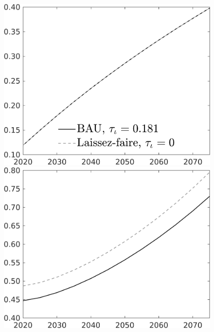 \documentclass[12pt]{article}
\begin{document}
\begin{figure}[h!!]
\begin{minipage}[]{0.32\textwidth}
	\end{minipage}	
	\begin{minipage}[]{0.32\textwidth}
		\includegraphics[width=1\textwidth]{../../codding_model/own_basedOnFried/optimalPol_010922_revision/figures/all_13Sept22/CompTaul_Equlab_LFBAU_Reg0_GFF_spillover0_nsk1_xgr0_knspil0_sep1_countec0_GovRev0_etaa0.79_lgd1.png}
	\end{minipage}	
	\begin{minipage}[]{0.32\textwidth}
		\includegraphics[width=1\textwidth]{../../codding_model/own_basedOnFried/optimalPol_010922_revision/figures/all_13Sept22/CompTaul_Equlab_LFBAU_Reg0_F_spillover0_nsk1_xgr0_knspil0_sep1_countec0_GovRev0_etaa0.79_lgd0.png}

\end{minipage}
\end{figure}
\end{document}
